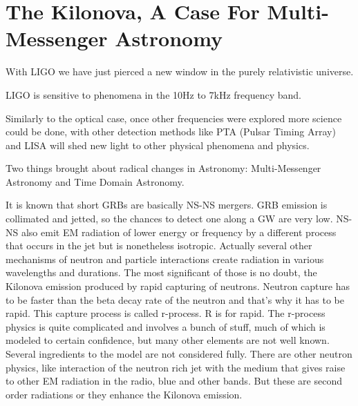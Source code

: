 \section{The Kilonova, A Case For Multi-Messenger Astronomy}


With LIGO we have just pierced a new window in the purely relativistic universe.

LIGO is sensitive to phenomena in the 10Hz to 7kHz frequency band.

Similarly to the optical case, once other frequencies were explored more science could be done, with other detection methods like PTA (Pulsar Timing Array) and LISA will shed new light to other physical phenomena and physics.

Two things brought about radical changes in Astronomy: Multi-Messenger Astronomy and Time Domain Astronomy.


It is known that short GRBs are basically NS-NS mergers.
GRB emission is collimated and jetted, so the chances to detect one along a GW are very low.
NS-NS also emit EM radiation of lower energy or frequency by a different process that occurs in the jet but is nonetheless isotropic. 
Actually several other mechanisms of neutron and particle interactions create radiation in various wavelengths and durations.
The most significant of those is no doubt, the Kilonova emission produced by rapid capturing of neutrons.
Neutron capture has to be faster than the beta decay rate of the neutron and that's why it has to be rapid.
This capture process is called r-process. R is for rapid.
The r-process physics is quite complicated and involves a bunch of stuff, much of which is modeled to certain confidence, but many other elements are not well known. Several ingredients to the model are not considered fully. 
There are other neutron physics, like interaction of the neutron rich jet with the medium that gives raise to other EM radiation in the radio, blue and other bands. But these are second order radiations or they enhance the Kilonova emission.

